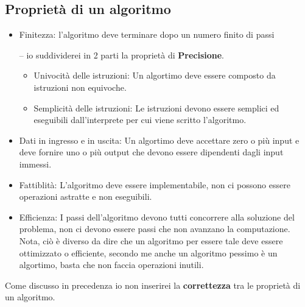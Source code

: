 \documentclass[a4paper]{article}
\begin{document}
\subsection{Proprietà di un algoritmo}
\begin{itemize}
	\item Finitezza: l'algoritmo deve terminare dopo un numero finito di passi
	\item[--]io suddividerei in 2 parti la proprietà di \textbf{Precisione}. 
		\begin{itemize}
	\item Univocità delle istruzioni: Un algortimo deve essere composto da istruzioni non equivoche.
	\item Semplicità delle istruzioni: Le istruzioni devono essere semplici ed eseguibili dall'interprete per cui viene scritto l'algoritmo.
		\end{itemize}
	\item Dati in ingresso e in uscita: Un algortimo deve accettare zero o più input e deve fornire uno o più output che devono essere dipendenti dagli input immessi.
	\item Fattiblità: L'algoritmo deve essere implementabile, non ci possono essere operazioni astratte e non eseguibili.
	\item Efficienza: I passi dell'algoritmo devono tutti concorrere alla soluzione del problema, non ci devono essere passi che non avanzano la computazione.\\
		Nota, ciò è diverso da dire che un algoritmo per essere tale deve essere ottimizzato o efficiente, secondo me anche un algoritmo pessimo è un algortimo, basta che non faccia operazioni inutili.

\end{itemize}
Come discusso in precedenza io non inserirei la \textbf{correttezza} tra le proprietà di un algoritmo.
\end{document}
